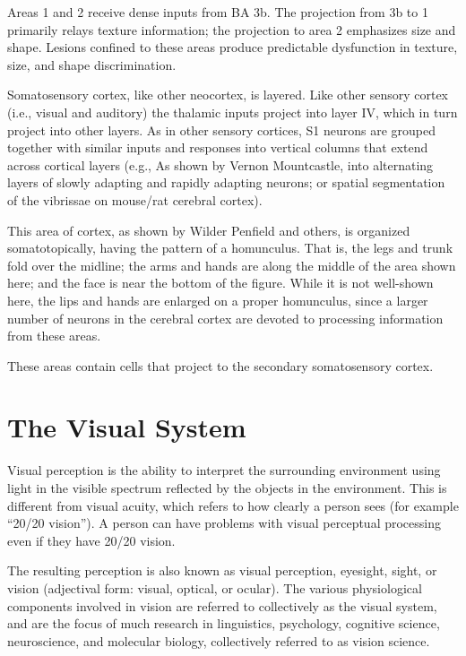 Areas 1 and 2 receive dense inputs from BA 3b. The projection from 3b to 1 primarily relays texture information; the projection to area 2 emphasizes size and shape. Lesions confined to these areas produce predictable dysfunction in texture, size, and shape discrimination.

Somatosensory cortex, like other neocortex, is layered. Like other sensory cortex (i.e., visual and auditory) the thalamic inputs project into layer IV, which in turn project into other layers. As in other sensory cortices, S1 neurons are grouped together with similar inputs and responses into vertical columns that extend across cortical layers (e.g., As shown by Vernon Mountcastle, into alternating layers of slowly adapting and rapidly adapting neurons; or spatial segmentation of the vibrissae on mouse/rat cerebral cortex).

This area of cortex, as shown by Wilder Penfield and others, is organized somatotopically, having the pattern of a homunculus. That is, the legs and trunk fold over the midline; the arms and hands are along the middle of the area shown here; and the face is near the bottom of the figure. While it is not well-shown here, the lips and hands are enlarged on a proper homunculus, since a larger number of neurons in the cerebral cortex are devoted to processing information from these areas.

These areas contain cells that project to the secondary somatosensory cortex.

\hypertarget{the-visual-system}{%
\chapter{The Visual System}\label{the-visual-system}}

Visual perception is the ability to interpret the surrounding environment using light in the visible spectrum reflected by the objects in the environment. This is different from visual acuity, which refers to how clearly a person sees (for example ``20/20 vision''). A person can have problems with visual perceptual processing even if they have 20/20 vision.

The resulting perception is also known as visual perception, eyesight, sight, or vision (adjectival form: visual, optical, or ocular). The various physiological components involved in vision are referred to collectively as the visual system, and are the focus of much research in linguistics, psychology, cognitive science, neuroscience, and molecular biology, collectively referred to as vision science.

